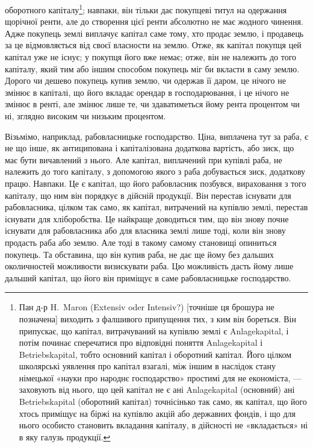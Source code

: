 \parcont{}  %
оборотного капіталу\footnote{
Пан д-р H.~Maron (Extensiv oder Intensiv?) [точніше ця брошура не позначена] виходить з
фалшивого припущення тих, з ким він бореться. Він припускає, що капітал, витрачуваний на купівлю
землі є Anlagekapital, і потім починає сперечатися про відповідні поняття Anlagekapital і
Betriebskapital, тобто основний капітал і оборотний капітал. Його цілком школярські уявлення про
капітал взагалі, між іншим в наслідок стану німецької «науки про народнє господарство» простимі для
не економіста, — заховують від нього, що цей капітал не є ані Anlagekapital (основний) ані
Betriebskapital
(оборотний капітал) точнісінько так само, як капітал, що його хтось приміщує на біржі на купівлю
акцій або державних фондів, і що для нього особисто становить вкладання капіталу, в дійсності не
«вкладається» ні в яку галузь продукції.
}; навпаки, він тільки дає покупцеві титул на одержання
щорічної ренти, але до створення цієї ренти абсолютно не має жодного чинення.
Адже покупець землі виплачує капітал саме тому, хто продає землю, і продавець
за це відмовляється від своєї власности на землю. Отже, як капітал покупця
цей капітал уже не існує; у покупця його вже немає; отже, він не належить
до того капіталу, який тим або іншим способом покупець міг би вкласти
в саму землю. Дорого чи дешево покупець купив землю, чи одержав її даром,
це нічого не змінює в капіталі, що його вкладає орендар в господарювання, і
це нічого не змінює в ренті, але змінює лише те, чи здаватиметься йому рента
процентом чи ні, зглядно високим чи низьким процентом.

Візьмімо, наприклад, рабовласницьке господарство. Ціна, виплачена тут
за раба, є не що інше, як антиципована і капіталізована додаткова вартість,
або зиск, що має бути вичавлений з нього. Але капітал, виплачений при купівлі
раба, не належить до того капіталу, з допомогою якого з раба добувається
зиск, додаткову працю. Навпаки. Це є капітал, що його рабовласник позбувся,
вираховання з того капіталу, що ним він порядкує в дійсній продукції. Він
перестав існувати для рабовласника, цілком так само, як капітал, витрачений
на купівлю землі, перестав існувати для хліборобства. Це найкраще доводиться
тим, що він знову почне існувати для рабовласника або для власника землі
лише тоді, коли він знову продасть раба або землю. Але тоді в такому самому
становищі опиниться покупець. Та обставина, що він купив раба, не дає ще
йому без дальших околичностей можливости визискувати раба. Цю можливість
дасть йому лише дальший капітал, що його він приміщує в саме рабовласницьке
господарство.

